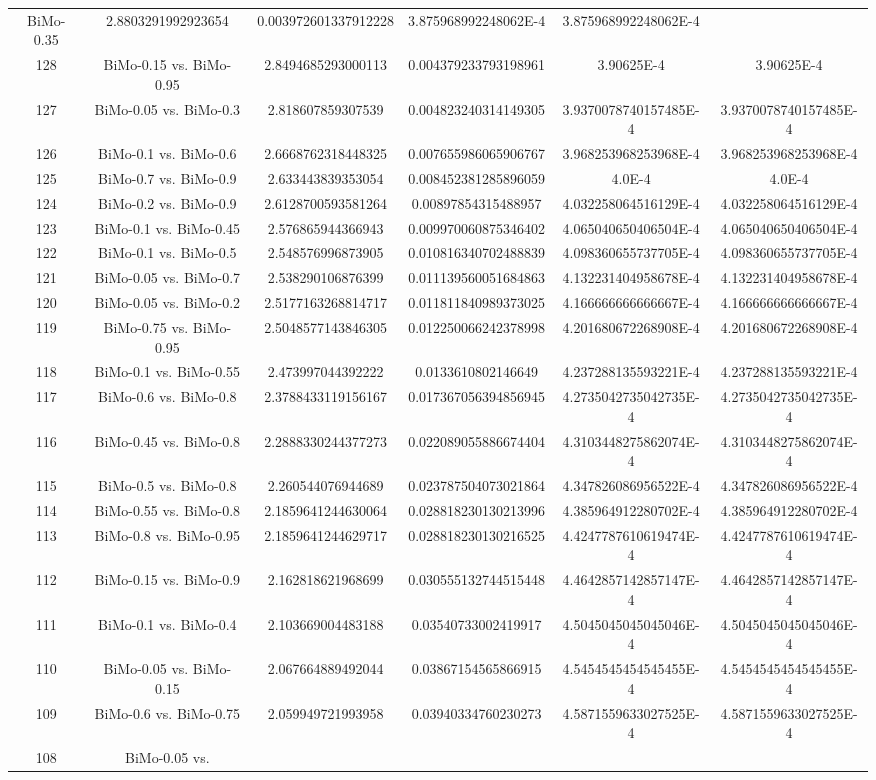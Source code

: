 \documentclass[a4paper,10pt]{article}
\begin{document}
\begin{landscape}
\begin{table}[!htp]
\begin{tabular}{cccccc}
BiMo-0.35&2.8803291992923654&0.003972601337912228&3.875968992248062E-4&3.875968992248062E-4\\128&BiMo-0.15 vs. BiMo-0.95&2.8494685293000113&0.004379233793198961&3.90625E-4&3.90625E-4\\127&BiMo-0.05 vs. BiMo-0.3&2.818607859307539&0.004823240314149305&3.9370078740157485E-4&3.9370078740157485E-4\\126&BiMo-0.1 vs. BiMo-0.6&2.6668762318448325&0.007655986065906767&3.968253968253968E-4&3.968253968253968E-4\\125&BiMo-0.7 vs. BiMo-0.9&2.633443839353054&0.008452381285896059&4.0E-4&4.0E-4\\124&BiMo-0.2 vs. BiMo-0.9&2.6128700593581264&0.00897854315488957&4.032258064516129E-4&4.032258064516129E-4\\123&BiMo-0.1 vs. BiMo-0.45&2.576865944366943&0.009970060875346402&4.065040650406504E-4&4.065040650406504E-4\\122&BiMo-0.1 vs. BiMo-0.5&2.548576996873905&0.010816340702488839&4.098360655737705E-4&4.098360655737705E-4\\121&BiMo-0.05 vs. BiMo-0.7&2.538290106876399&0.011139560051684863&4.132231404958678E-4&4.132231404958678E-4\\120&BiMo-0.05 vs. BiMo-0.2&2.5177163268814717&0.011811840989373025&4.166666666666667E-4&4.166666666666667E-4\\119&BiMo-0.75 vs. BiMo-0.95&2.5048577143846305&0.012250066242378998&4.201680672268908E-4&4.201680672268908E-4\\118&BiMo-0.1 vs. BiMo-0.55&2.473997044392222&0.0133610802146649&4.237288135593221E-4&4.237288135593221E-4\\117&BiMo-0.6 vs. BiMo-0.8&2.3788433119156167&0.017367056394856945&4.2735042735042735E-4&4.2735042735042735E-4\\116&BiMo-0.45 vs. BiMo-0.8&2.2888330244377273&0.022089055886674404&4.3103448275862074E-4&4.3103448275862074E-4\\115&BiMo-0.5 vs. BiMo-0.8&2.260544076944689&0.023787504073021864&4.347826086956522E-4&4.347826086956522E-4\\114&BiMo-0.55 vs. BiMo-0.8&2.1859641244630064&0.028818230130213996&4.385964912280702E-4&4.385964912280702E-4\\113&BiMo-0.8 vs. BiMo-0.95&2.1859641244629717&0.028818230130216525&4.4247787610619474E-4&4.4247787610619474E-4\\112&BiMo-0.15 vs. BiMo-0.9&2.162818621968699&0.030555132744515448&4.4642857142857147E-4&4.4642857142857147E-4\\111&BiMo-0.1 vs. BiMo-0.4&2.103669004483188&0.03540733002419917&4.5045045045045046E-4&4.5045045045045046E-4\\110&BiMo-0.05 vs. BiMo-0.15&2.067664889492044&0.03867154565866915&4.5454545454545455E-4&4.5454545454545455E-4\\109&BiMo-0.6 vs. BiMo-0.75&2.059949721993958&0.03940334760230273&4.5871559633027525E-4&4.5871559633027525E-4\\108&BiMo-0.05 vs. 
\end{tabular}
\end{table}
\end{landscape}
\end{document}
